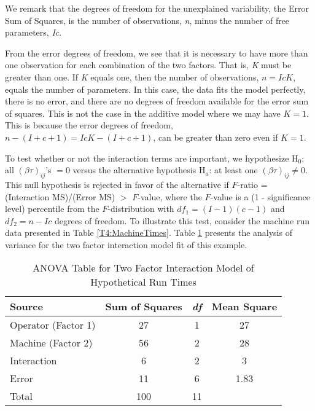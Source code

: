 \noindent We remark that the degrees of freedom for the unexplained
variability, the Error Sum of Squares, is the number of
observations, \textit{n}, minus the number of free parameters,
\textit{Ic}.

From the error degrees of freedom, we see that it is necessary to
have more than one observation for each combination of the two
factors. That is, \textit{K} must be greater than one. If \textit{K}
equals one, then the number of observations, $n=IcK$, equals the
number of parameters. In this case, the data fits the model
perfectly, there is no error, and there are no degrees of freedom
available for the error sum of squares. This is not the case in the
additive model where we may have $K=1$. This is because the error
degrees of freedom, $n-(I+c+1)=IcK-(I+c+1)$, can be greater than
zero even if $K=1$.

To test whether or not the interaction terms are important, we hypothesize H$%
_{0}$: all $(\beta \tau )_{ij}$'s $=0$ versus the alternative hypothesis H$%
_{a}$: at least one $(\beta \tau )_{ij}\neq 0$. This null hypothesis
is rejected in favor of the alternative if $F$-ratio = (Interaction
MS)/(Error MS) $>$ $F$-value, where the $F$-value is a (1 -
significance level) percentile from the $F$-distribution with
$df_{1}=(I-1)(c-1)$ and $df_{2}=n-Ic$ degrees of freedom. To
illustrate this test, consider the machine run data presented in
Table \ref{T4:MachineTimes}. Table \ref{T4:TwoFactorANOVARunTimes}
presents the analysis of variance for the two factor interaction
model fit of this example.

  \begin{center}  \begin{table}[h]
\caption{\label{T4:TwoFactorANOVARunTimes} ANOVA Table for Two
Factor Interaction Model of Hypothetical Run Times}
\begin{tabular}{lccc}
\hline Source & Sum of Squares & \textit{df} & Mean Square \\ \hline
Operator (Factor 1)      & 27  & 1  & 27 \\
Machine (Factor 2)       & 56  & 2  & 28 \\
Interaction              & 6   & 2  & 3 \\
Error                    & 11  & 6  & 1.83 \\
Total                    & 100 & 11 &\\ \hline
\end{tabular}
\end{table}  \end{center}  

